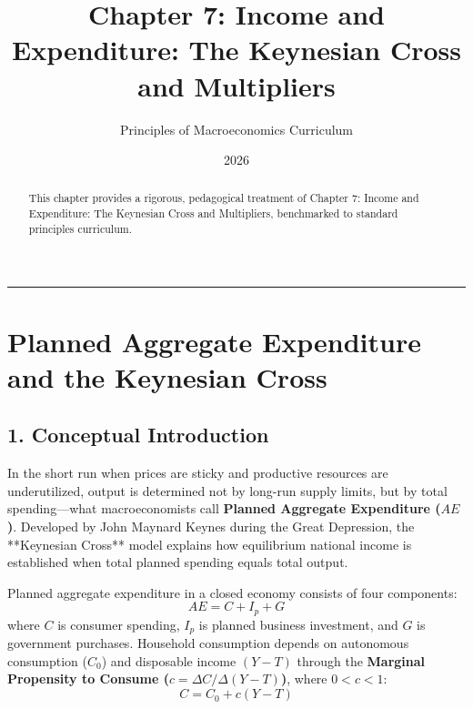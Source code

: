 \documentclass[11pt,letterpaper]{article}
\begin{document}
\title{\Huge\bfseries\color{SlateBlue} Chapter 7: Income and Expenditure: The Keynesian Cross and Multipliers}
\author{\large Principles of Macroeconomics Curriculum}
\date{2026}
\maketitle

\thispagestyle{plain}

\begin{abstract}
This chapter provides a rigorous, pedagogical treatment of Chapter 7: Income and Expenditure: The Keynesian Cross and Multipliers, benchmarked to standard principles curriculum.
\end{abstract}

\tableofcontents
\vspace{1.5em}
\hrule
\vspace{1.5em}

\section{Planned Aggregate Expenditure and the Keynesian Cross}

\subsection*{1. Conceptual Introduction}
In the short run when prices are sticky and productive resources are underutilized, output is determined not by long-run supply limits, but by total spending—what macroeconomists call \textbf{Planned Aggregate Expenditure ($AE$)}. Developed by John Maynard Keynes during the Great Depression, the **Keynesian Cross** model explains how equilibrium national income is established when total planned spending equals total output.

Planned aggregate expenditure in a closed economy consists of four components:
\begin{equation}
AE = C + I_p + G
\end{equation}
where $C$ is consumer spending, $I_p$ is planned business investment, and $G$ is government purchases. Household consumption depends on autonomous consumption ($C_0$) and disposable income $(Y - T)$ through the \textbf{Marginal Propensity to Consume ($c = \Delta C / \Delta(Y-T)$)}, where $0 < c < 1$:
\begin{equation}
C = C_0 + c(Y - T)
\end{equation}
\end{document}
